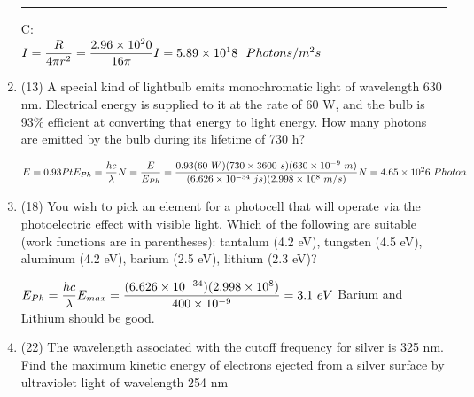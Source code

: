 \documentclass[fleqn]{article}
\begin{document}
\begin{enumerate}
      \textcolor{hwColor}{   
        \rule{15cm}{0.4pt}   
      }

      \textcolor{hwColor}{
        C: \\
        $
          I=\dfrac{R}{4 \pi r^2}=\dfrac{2.96 \times 10^20}{16\pi} \\
          \\
          I=5.89 \times 10^18 ~~ Photons/m^2s
        $
      }

    \item (13) A special kind of lightbulb emits monochromatic light of wavelength 630 nm. Electrical energy is supplied to it at the rate of
    60 W, and the bulb is 93\% efficient at converting that energy to
    light energy. How many photons are emitted by the bulb during its
    lifetime of 730 h?

      \textcolor{hwColor}{
        $
          E=0.93Pt \\
          \\
          E_{Ph}=\dfrac{hc}{\lambda} \\
          \\
          N=\dfrac{E}{E_{Ph}}=\dfrac{0.93(60 ~ W)(730 \times 3600 ~ s)(630 \times 10^{-9} ~ m)}{(6.626 \times 10^{-34} ~ js)(2.998 \times 10^8 ~ m/s)} \\
          \\
          N=4.65 \times 10^26 ~ Photon
        $
      }

    \item (18) You wish to pick an element for a photocell that will operate
    via the photoelectric effect with visible light. Which of the following are suitable (work functions are in parentheses): tantalum (4.2
    eV), tungsten (4.5 eV), aluminum (4.2 eV), barium (2.5 eV),
    lithium (2.3 eV)?

    \textcolor{hwColor}{
      $
        E_{Ph}=\dfrac{hc}{\lambda} \\
        \\
        E_{max}=\dfrac{(6.626 \times 10^{-34})(2.998 \times 10^8)}{400 \times 10^{-9}}=3.1 ~ eV \\
        \\
      $
      Barium and Lithium should be good. 
    }

    \item (22) The wavelength associated with the cutoff frequency for
    silver is 325 nm. Find the maximum kinetic energy of electrons
    ejected from a silver surface by ultraviolet light of wavelength
    254 nm


\end{enumerate}
\end{document}
